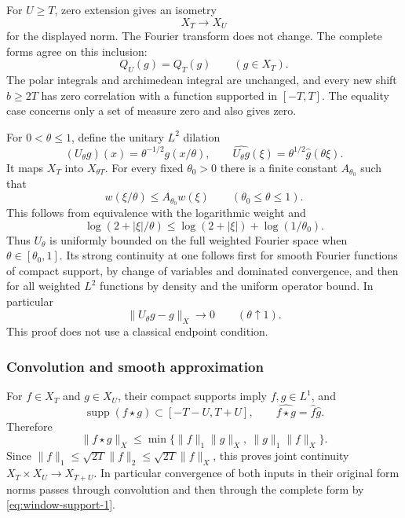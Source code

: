 For $U\ge T$, zero extension gives an isometry
\[
 X_T\longrightarrow X_U
\]
for the displayed norm.  The Fourier transform does not change.
The complete forms agree on this inclusion:
\begin{equation}
 Q_U(g)=Q_T(g)\qquad(g\in X_T).
 \label{eq:window-support-2}
\end{equation}
The polar integrals and archimedean integral are unchanged, and
every new shift $b\ge2T$ has zero correlation with a function
supported in $[-T,T]$.  The equality case concerns only a set
of measure zero and also gives zero.

For $0<\theta\le1$, define the unitary $L^2$ dilation
\[
 (U_\theta g)(x)=\theta^{-1/2}g(x/\theta),\qquad
 \widehat{U_\theta g}(\xi)=\theta^{1/2}\widehat g(\theta\xi).
\]
It maps $X_T$ into $X_{\theta T}$.  For every fixed
$\theta_0>0$ there is a finite constant $A_{\theta_0}$ such
that
\[
 w(\xi/\theta)\le A_{\theta_0}w(\xi)
       \qquad(\theta_0\le\theta\le1).
\]
This follows from equivalence with the logarithmic weight and
\[
 \log(2+|\xi|/\theta)
 \le\log(2+|\xi|)+\log(1/\theta_0).
\]
Thus $U_\theta$ is uniformly bounded on the full weighted
Fourier space when $\theta\in[\theta_0,1]$.
Its strong continuity at one follows first for smooth Fourier
functions of compact support, by change of variables and
dominated convergence, and then for all weighted $L^2$
functions by density and the uniform operator bound.  In
particular
\begin{equation}
 \|U_\theta g-g\|_X\longrightarrow0\qquad(\theta\uparrow1).
 \label{eq:window-support-3}
\end{equation}
This proof does not use a classical endpoint condition.

\subsubsection{Convolution and smooth approximation}

For $f\in X_T$ and $g\in X_U$, their compact supports imply
$f,g\in L^1$, and
\[
 \operatorname{supp}(f\star g)\subset[-T-U,T+U],\qquad
 \widehat{f\star g}=\widehat f\widehat g.
\]
Therefore
\begin{equation}
 \|f\star g\|_X
 \le\min\{\|f\|_1\|g\|_X,\ \|g\|_1\|f\|_X\}.
 \label{eq:window-support-4}
\end{equation}
Since $\|f\|_1\le\sqrt{2T}\|f\|_2\le\sqrt{2T}\|f\|_X$,
this proves joint continuity
$X_T\times X_U\to X_{T+U}$.  In particular convergence of
both inputs in their original form norms passes through
convolution and then through the complete form by \eqref{eq:window-support-1}.

